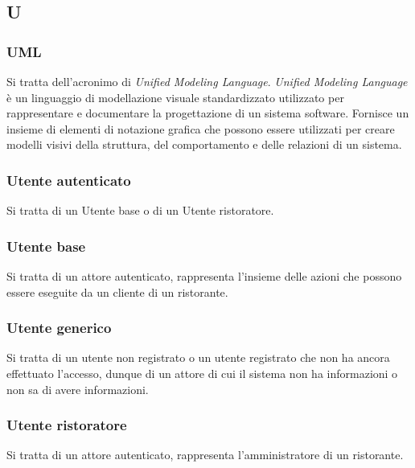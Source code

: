 \subsection{U}

\subsubsection{UML}
Si tratta dell'acronimo di \textit{Unified Modeling Language}.
\textit{Unified Modeling Language} è un linguaggio di modellazione visuale
standardizzato utilizzato per rappresentare e documentare la progettazione di un
sistema software.
Fornisce un insieme di elementi di notazione grafica che possono essere
utilizzati per creare modelli visivi della struttura, del comportamento e delle
relazioni di un sistema.

\subsubsection{Utente autenticato}
Si tratta di un Utente base o di un Utente ristoratore.

\subsubsection{Utente base}
\label{utenteBase}
Si tratta di un attore autenticato, rappresenta l'insieme delle azioni che
possono essere eseguite da un cliente di un ristorante.

\subsubsection{Utente generico}
Si tratta di un utente non registrato o un utente registrato che non ha ancora
effettuato l’accesso, dunque di un attore di cui il sistema non ha informazioni
o non sa di avere informazioni.

\subsubsection{Utente ristoratore}
Si tratta di un attore autenticato, rappresenta l'amministratore di un
ristorante.

\newpage
